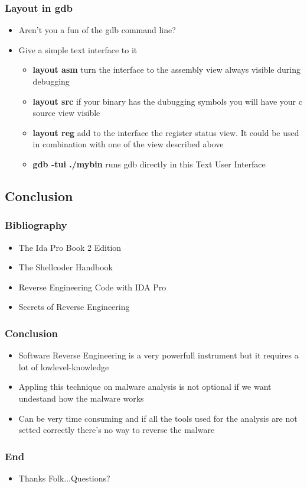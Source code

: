 \documentclass[]{beamer}
\begin{document}
      \begin{frame}
        \frametitle{Layout in gdb}
        \begin{itemize}
            \item{Aren't you a fun of the gdb command line?}
            \item{Give a simple text interface to it}
            \begin{itemize}
                \item{{\bf layout asm} turn the interface to the assembly view always visible during debugging}
                \item{{\bf layout src} if your binary has the dubugging symbols you will have your c source view visible}
                \item{{\bf layout reg} add to the interface the register status view. It could be used in combination with one of the view described above}
                \item{{\bf gdb -tui ./mybin} runs gdb directly in this Text User Interface}
            \end{itemize}
        \end{itemize}
      \end{frame}
		\subsection{Conclusion}
		\begin{frame}
			\frametitle{Bibliography}
			\begin{itemize}
				\item{The Ida Pro Book 2 Edition }
				\item{The Shellcoder Handbook}
				\item{Reverse Engineering Code with IDA Pro}
				\item{Secrets of Reverse Engineering}
			\end{itemize}
		\end{frame}
	 	\begin{frame}
			\frametitle{Conclusion}
			\begin{itemize}
				\item{Software Reverse Engineering is a very powerfull instrument but it requires a lot of lowlevel-knowledge }
				\item{Appling this technique on malware analysis is not optional if we want undestand how the malware works}
				\item{Can be very time consuming and if all the tools used for the analysis are not setted correctly there's no way to reverse the malware }
			\end{itemize}
		\end{frame}
		\begin{frame}
			\frametitle{End}
			\begin{itemize}
				\item{Thanks Folk...Questions?}
			\end{itemize}
		\end{frame}
\end{document}
